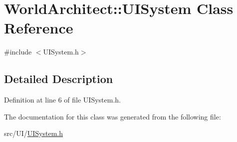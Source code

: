 \hypertarget{class_world_architect_1_1_u_i_system}{}\section{World\+Architect\+::U\+I\+System Class Reference}
\label{class_world_architect_1_1_u_i_system}


{\ttfamily \#include $<$U\+I\+System.\+h$>$}



\subsection{Detailed Description}


Definition at line 6 of file U\+I\+System.\+h.



The documentation for this class was generated from the following file\+:\begin{DoxyCompactItemize}
\item 
src/\+U\+I/\mbox{\hyperlink{_u_i_system_8h}{U\+I\+System.\+h}}\end{DoxyCompactItemize}
